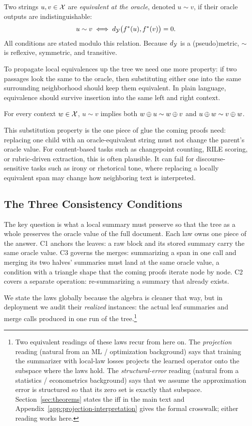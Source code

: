 Two strings $u, v \in \mathcal{X}$ are \emph{equivalent at the oracle}, denoted $u \sim v$, if their oracle outputs are indistinguishable:
\[
u \sim v \;\Longleftrightarrow\; d_{\mathcal{Y}}\big(f^\ast(u), f^\ast(v)\big) = 0.
\]
All conditions are stated modulo this relation. Because $d_{\mathcal{Y}}$ is a (pseudo)metric, $\sim$ is reflexive, symmetric, and transitive.

To propagate local equivalences up the tree we need one more property: if two passages look the same to the oracle, then substituting either one into the same surrounding neighborhood should keep them equivalent. In plain language, equivalence should survive insertion into the same left and right context.

\begin{assumption}\label{ass:context}
For every context $w \in \mathcal{X}$, $u \sim v$ implies both $w \oplus u \sim w \oplus v$ and $u \oplus w \sim v \oplus w$.
\end{assumption}

This substitution property is the one piece of glue the coming proofs need: replacing one child with an oracle-equivalent string must not change the parent's oracle value. For content-based tasks such as changepoint counting, RILE scoring, or rubric-driven extraction, this is often plausible. It can fail for discourse-sensitive tasks such as irony or rhetorical tone, where replacing a locally equivalent span may change how neighboring text is interpreted.

\subsection{The Three Consistency Conditions}

The key question is what a local summary must preserve so that the tree as a whole preserves the oracle value of the full document. Each law owns one piece of the answer. C1 anchors the leaves: a raw block and its stored summary carry the same oracle value. C3 governs the merges: summarizing a span in one call and merging its two halves' summaries must land at the same oracle value, a condition with a triangle shape that the coming proofs iterate node by node. C2 covers a separate operation: re-summarizing a summary that already exists.

We state the laws globally because the algebra is cleaner that way, but in deployment we audit their \emph{realized} instances: the actual leaf summaries and merge calls produced in one run of the tree.\footnote{Two equivalent readings of these laws recur from here on. The \emph{projection} reading (natural from an ML / optimization background) says that training the summarizer with local-law losses projects the learned operator onto the subspace where the laws hold. The \emph{structural-error} reading (natural from a statistics / econometrics background) says that we assume the approximation error is structured so that its zero set is exactly that subspace. Section~\ref{sec:theorems} states the iff in the main text and Appendix~\ref{app:projection-interpretation} gives the formal crosswalk; either reading works here.}

